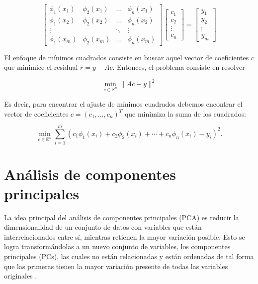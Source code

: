 \[
\left[\begin{array}{cccc}
	\phi_{1}\left(x_{1}\right) & \phi_{2}\left(x_{1}\right) & \ldots & \phi_{n}\left(x_{1}\right) \\
	\phi_{1}\left(x_{2}\right) & \phi_{2}\left(x_{2}\right) & \ldots & \phi_{n}\left(x_{2}\right) \\
	\vdots & & \ddots & \vdots \\
	\phi_{1}\left(x_{m}\right) & \phi_{2}\left(x_{m}\right) & \ldots & \phi_{n}\left(x_{m}\right)
\end{array}\right]\left[\begin{array}{c}
	c_{1} \\
	c_{2} \\
	\vdots \\
	c_{n}
\end{array}\right]=\left[\begin{array}{c}
	y_{1} \\
	y_{2} \\
	\vdots \\
	y_{m}
\end{array}\right]
\]

El enfoque de mínimos cuadrados consiste en buscar aquel vector de coeficientes $c$ que minimice el residual $r=y-Ac$. Entonces, el problema consiste en resolver 

\[
\min _{c \in \mathbb{R}^{n}}\|A c-y\|^{2}
\]

Es decir, para encontrar el ajuste de mínimos cuadrados debemos encontrar el vector de coeficientes $c=(c_1,...,c_n)^T$ que minimiza la suma de los cuadrados:

\[
\min _{c \in \mathbb{R}^{n}} \sum_{i=1}^{m}\left(c_{1} \phi_{1}\left(x_{i}\right)+c_{2} \phi_{2}\left(x_{i}\right)+\cdots+c_{n} \phi_{n}\left(x_{i}\right)-y_{i}\right)^{2}.
\]

\section{Análisis de componentes principales}

La idea principal del análisis de componentes principales (PCA) es reducir la dimensionalidad de un conjunto de datos con variables que están interrelacionados entre sí, mientras retienen la mayor variación posible. Esto se logra transformándolas a un nuevo conjunto de variables, los componentes principales (PCs), las cuales no están relacionadas y están ordenadas de tal forma que las primeras tienen la mayor variación presente de todas las variables originales \cite{jolliffePrincipalComponentAnalysis2002}.

